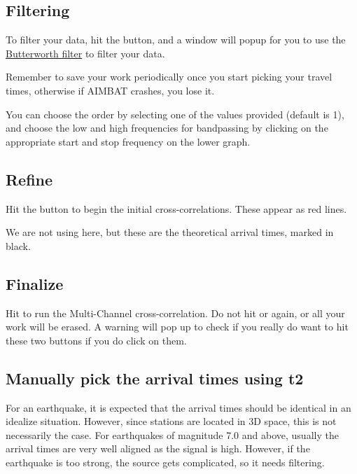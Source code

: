 \documentclass[letterpaper,10pt,english]{sphinxmanual}
\begin{document}
\subsection{Filtering}
\label{docfiles/PickingTravelTimes:filtering}
To filter your data, hit the  button, and a window will popup for you to use the \href{http://en.wikipedia.org/wiki/Butterworth\_filter}{Butterworth filter} to filter your data.

Remember to save your work periodically once you start picking your travel times, otherwise if AIMBAT crashes, you lose it.

You can choose the order by selecting one of the values provided (default is 1), and choose the low and high frequencies for bandpassing by clicking on the appropriate start and stop frequency on the lower graph.


\subsection{Refine}
\label{docfiles/PickingTravelTimes:refine}
Hit the  button to begin the initial cross-correlations. These appear as red lines.

We are not using  here, but these are the theoretical arrival times, marked in black.


\subsection{Finalize}
\label{docfiles/PickingTravelTimes:finalize}
Hit  to run the Multi-Channel cross-correlation. Do not hit  or  again, or all your work will be erased. A warning will pop up to check if you really do want to hit these two buttons if you do click on them.


\subsection{Manually pick the arrival times using t2}
\label{docfiles/PickingTravelTimes:manually-pick-the-arrival-times-using-t2}
For an earthquake, it is expected that the arrival times should be identical in an idealize situation. However, since stations are located in 3D space, this is not necessarily the case. For earthquakes of magnitude 7.0 and above, usually the arrival times are very well aligned as the signal is high. However, if the earthquake is too strong, the source gets complicated, so it needs filtering.
\end{document}
